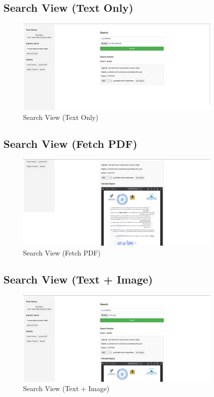\subsection{Search View (Text Only)}

\begin{figure}[H]
\centering
  \includegraphics[width=0.9\textwidth]{img/Interfaces/search_text.png}
\caption{Search View (Text Only)}
\label{Search View (Text Only)}      
\end{figure}

\subsection{Search View (Fetch PDF)}

\begin{figure}[H]
\centering
  \includegraphics[width=0.9\textwidth]{img/Interfaces/search_text_fetch.png}
\caption{Search View (Fetch PDF)}
\label{Search View (Fetch PDF)}      
\end{figure}


\subsection{Search View (Text + Image)}

\begin{figure}[H]
\centering
  \includegraphics[width=0.9\textwidth]{img/Interfaces/search_text_image.png}
\caption{Search View (Text + Image)}
\label{Search View (Text + Image)}      
\end{figure}

